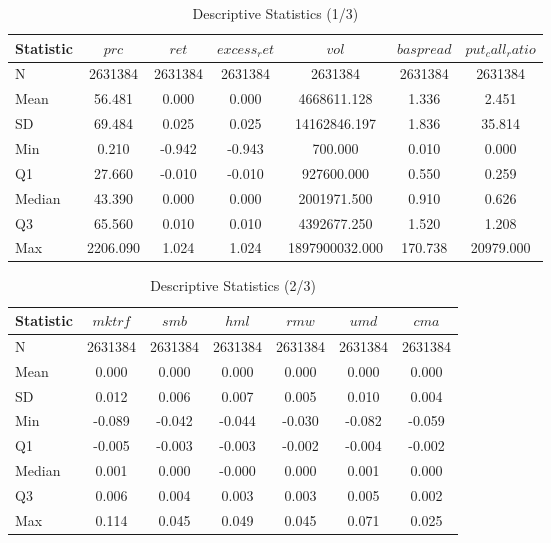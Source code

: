 \begin{table}[ht]
\centering
\caption{Descriptive Statistics (1/3)}
\label{tab:descr_stats}
\begin{tabular}{lcccccc}
\toprule
Statistic & $prc$ & $ret$ & $excess_ret$ & $vol$ & $baspread$ & $put_call_ratio$ \\\midrule
N & 2631384 & 2631384 & 2631384 & 2631384 & 2631384 & 2631384 \\
Mean & 56.481 & 0.000 & 0.000 & 4668611.128 & 1.336 & 2.451 \\
SD & 69.484 & 0.025 & 0.025 & 14162846.197 & 1.836 & 35.814 \\
Min & 0.210 & -0.942 & -0.943 & 700.000 & 0.010 & 0.000 \\
Q1 & 27.660 & -0.010 & -0.010 & 927600.000 & 0.550 & 0.259 \\
Median & 43.390 & 0.000 & 0.000 & 2001971.500 & 0.910 & 0.626 \\
Q3 & 65.560 & 0.010 & 0.010 & 4392677.250 & 1.520 & 1.208 \\
Max & 2206.090 & 1.024 & 1.024 & 1897900032.000 & 170.738 & 20979.000 \\
\bottomrule
\end{tabular}
\end{table}

\begin{table}[ht]
\centering
\caption{Descriptive Statistics (2/3)}
\label{tab:descr_stats2}
\begin{tabular}{lcccccc}
\toprule
Statistic & $mktrf$ & $smb$ & $hml$ & $rmw$ & $umd$ & $cma$ \\\midrule
N & 2631384 & 2631384 & 2631384 & 2631384 & 2631384 & 2631384 \\
Mean & 0.000 & 0.000 & 0.000 & 0.000 & 0.000 & 0.000 \\
SD & 0.012 & 0.006 & 0.007 & 0.005 & 0.010 & 0.004 \\
Min & -0.089 & -0.042 & -0.044 & -0.030 & -0.082 & -0.059 \\
Q1 & -0.005 & -0.003 & -0.003 & -0.002 & -0.004 & -0.002 \\
Median & 0.001 & 0.000 & -0.000 & 0.000 & 0.001 & 0.000 \\
Q3 & 0.006 & 0.004 & 0.003 & 0.003 & 0.005 & 0.002 \\
Max & 0.114 & 0.045 & 0.049 & 0.045 & 0.071 & 0.025 \\
\bottomrule
\end{tabular}
\end{table}

